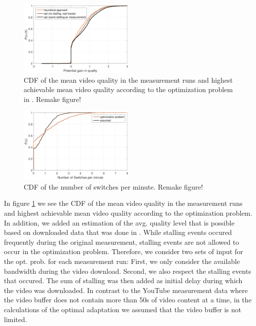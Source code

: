 \begin{figure}[t]
\centering
\includegraphics[width=0.5\textwidth]{figs/qualitygain}%
\caption{CDF of the mean video quality in the measurement runs and highest achievable mean video quality according to the optimization problem in \cite{hossfeld2015identifying}. Remake figure!}
\label{fig:opt}%
\end{figure}

\begin{figure}[t]
\centering
\includegraphics[width=0.5\textwidth]{figs/switches}%
\caption{CDF of the number of switches per minute. Remake figure!}
\label{fig:switches}%
\end{figure}

In figure \ref{fig:opt} we see the CDF of the mean video quality in the measurement runs and highest achievable mean video quality according to the optimization problem. In addition, we added an estimation of the avg. quality level that is possible based on downloaded data that was done in \cite{sieber16sacrificing}. While stalling events occured frequently during the original measurement, stalling events are not allowed to occur in the optimization problem. Therefore, we consider two sets of input for the opt. prob. for each measurement run: First, we only consider the available bandwidth during the video download. Second, we also respect the stalling events that occured. The sum of stalling was then added as initial delay during which the video was downloaded. In contrast to the YouTube measurement data where the video buffer does not contain more than 50s of video content at a time, in the calculations of the optimal adaptation we assumed that the video buffer is not limited.
